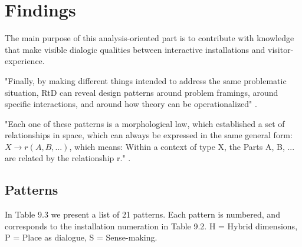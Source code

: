 \section{Findings}
The main purpose of this analysis-oriented part is to contribute with knowledge that make visible dialogic qualities between interactive installations and visitor-experience. 

"Finally, by making different things intended to address the same problematic situation, RtD can reveal design patterns \autocite{Alexander_book} around problem framings, around specific interactions, and around how theory can be operationalized" \autocite[p. 178]{zimmerman_research_2014}.


"Each one of these patterns is a morphological law, which established a set of relationships in space, which can always be expressed in the same general form: $X \rightarrow r (A, B, ...)$, which means: Within a context of type X, the Parts A, B, ... are related by the relationship r." \autocite[p. 90]{Alexander_book}.


\subsection{Patterns}
In Table 9.3 we present a list of 21 patterns. Each pattern is numbered, and corresponds to the installation numeration in Table 9.2. H = Hybrid dimensions, P = Place as dialogue, S = Sense-making.

